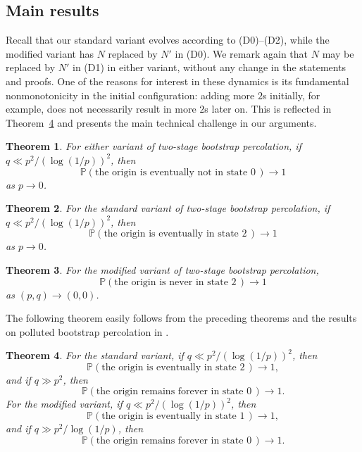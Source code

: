 \documentclass{article}
\renewcommand{\P}{\mathbb{P}}
\numberwithin{equation}{section}
\newtheorem{theorem}{Theorem}[section]
\begin{document}
\subsection{Main results}


Recall that our standard variant evolves according to (D0)--(D2), while the modified variant has $N$ replaced by $N'$ in (D0). We remark again that $N$ may be replaced by $N'$ in (D1) in either variant, without any change in the statements and proofs. One of the reasons for interest in these
dynamics is its fundamental nonmonotonicity in the initial configuration: 
adding more $2$s initially, 
for example, does not necessarily result in more $2$s later on. This is reflected in Theorem~\ref{thm:phase-transition} and presents the main 
technical challenge in our arguments.

\begin{theorem}\label{thm:0slose}
    For either variant of two-stage bootstrap percolation, if  $q \ll p^2/(\log(1/p))^2$, then
    \[
    \P(\text{the origin is eventually not in state 0}\, ) \to 1
    \]
    as $p \to 0$.
\end{theorem}

\begin{theorem}\label{thm:2swininstandard}
    For the standard variant of two-stage bootstrap percolation, if $q \ll p^2/(\log(1/p))^2$, then
    \[
    \P(\text{the origin is eventually in state 2}\, ) \to 1
    \]
    as $p \to 0$.
\end{theorem}

\begin{theorem}\label{thm:2sloseinmodified}
    For the modified variant of two-stage bootstrap percolation,
    \[
    \P(\text{the origin is never in state 2}\, ) \to 1
    \]
    as $(p, q) \to (0,0)$.
\end{theorem}

The following theorem easily follows from the preceding theorems and the results on polluted bootstrap percolation
in \cite{GravnerMcDonald, GravnerHolroydLeeSivakoff}.

\begin{theorem}\label{thm:phase-transition}
    For the standard variant, if $q \ll p^2/(\log(1/p))^2$, then
    \[
    \P(\text{the origin is eventually in state 2}\, ) \to 1,
    \]
    and if $q\gg p^2$, then
    \[
    \P(\text{the origin remains forever in state 0}\, ) \to 1.
    \]
    For the modified variant, if $q \ll p^2/(\log(1/p))^2$, then
    \[
    \P(\text{the origin is eventually in state 1}\, ) \to 1,
    \]
    and if $q\gg p^2/\log(1/p)$, then
    \[
    \P(\text{the origin remains forever in state 0}\, ) \to 1.
    \]

\end{theorem}
\end{document}

